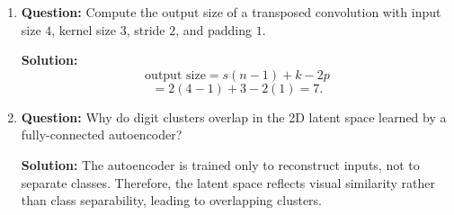 \documentclass{article}
\begin{document}
\begin{enumerate}
\textbf{Solution:}  
Convolutional layers share weights across spatial locations and preserve locality, allowing the network to learn spatial features efficiently with far fewer parameters.

\item \textbf{Question:}  
Compute the output size of a transposed convolution with input size \(4\), kernel size \(3\), stride \(2\), and padding \(1\).

\textbf{Solution:}  
\[
\text{output size}=s(n-1)+k-2p
\]
\[
=2(4-1)+3-2(1)=7.
\]

\item \textbf{Question:}  
Why do digit clusters overlap in the 2D latent space learned by a fully-connected autoencoder?

\textbf{Solution:}  
The autoencoder is trained only to reconstruct inputs, not to separate classes. Therefore, the latent space reflects visual similarity rather than class separability, leading to overlapping clusters.

\end{enumerate}
\end{document}
